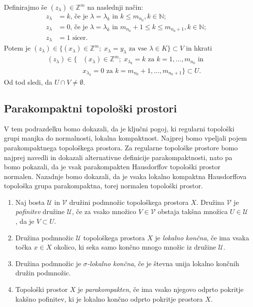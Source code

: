 \documentclass[mat1]{fmfdelo}
\newcommand{\N}{\mathbb N}
\newcommand{\Z}{\mathbb Z}
\begin{document}
\begin{dokaz}
Definirajmo še $(z_\lambda) \in \Z^m$ na naslednji način:
\begin{align*}
	z_\lambda &= k \text{, če je $\lambda = \lambda_k$ in $k \leq m_{n_0}$}, k \in \N; \\
	z_\lambda &= 0 \text{, če je $\lambda = \lambda_k$ in $m_{n_0} + 1 \leq k \leq m_{n_0+1}$}, k \in \N; \\
	z_\lambda &= 1 \text{ sicer.}
\end{align*}
Potem je $(z_\lambda) \in \lbrace (x_\lambda) \in \Z^m ;\; x_\lambda = y_\lambda \text{ za vse } \lambda  \in K \rbrace \subset V$ in hkrati
\begin{align*}
(z_\lambda) \in \lbrace &(x_\lambda) \in \Z^m ;\; x_{\lambda_k} = k \text{ za } k=1,\dots,m_{n_0} \text{ in }\\
& x_{\lambda_k} = 0 \text{ za } k = m_{n_0}+1,\dots, m_{n_0 + 1}\rbrace \subset U.
\end{align*}
Od tod sledi, da $U \cap V \neq \emptyset$.
\end{dokaz}

\subsection{Parakompaktni topološki prostori}
V tem podrazdelku bomo dokazali, da je ključni pogoj, ki regularni topološki grupi manjka do normalnosti, lokalna kompaktnost. Najprej bomo vpeljali pojem parakompaktnega topološkega prostora. Za regularne topološke prostore bomo najprej navedli in dokazali alternativne definicije parakompaktnosti, nato pa bomo pokazali, da je vsak parakompakten Hausdorffov topološki prostor normalen. Nazadnje bomo dokazali, da je vsaka lokalno kompaktna Hausdorffova topološka grupa parakompaktna, torej normalen topološki prostor.

\begin{definicija}\label{def:parakompakt}
	\begin{enumerate}
		\item Naj bosta $\mathcal{U}$ in $\mathcal{V}$ družini podmnožic topološkega prostora $X$. Družina $\mathcal{V}$ je \emph{pofinitev} družine $\mathcal{U}$, če za vsako množico $V \in \mathcal{V}$ obstaja takšna množica $U \in \mathcal{U}$, da je $V \subset U$.
		\item Družina podmnožic $\mathcal{U}$ topološkega prostora $X$ je \emph{lokalno končna}, če ima vsaka točka $x \in X$ okolico, ki seka samo končno mnogo množic iz družine $\mathcal{U}$.
		\item Družina podmnožic je \emph{$\sigma$-lokalno končna}, če je števna unija lokalno končnih družin podmnožic.
		\item Topološki prostor $X$ je \emph{parakompakten}, če ima vsako njegovo odprto pokritje kakšno pofinitev, ki je lokalno končno odprto pokritje prostora $X$.
	\end{enumerate}
\end{definicija}
\end{document}
